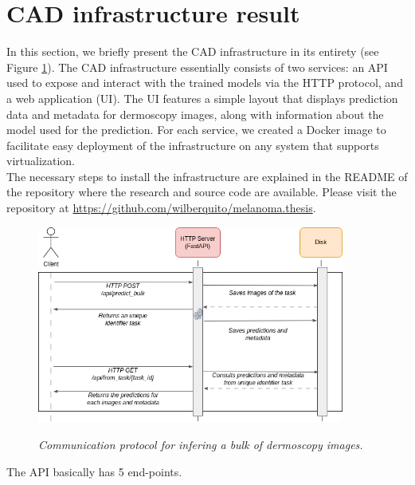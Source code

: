 \section{CAD infrastructure result}

In this section, we briefly present the CAD infrastructure in its entirety (see
Figure \ref{fig:background-task}). The CAD infrastructure essentially consists
of two services: an API used to expose and interact with the trained models via
the HTTP protocol, and a web application (UI). The UI features a simple layout
that displays prediction data and metadata for dermoscopy images, along with
information about the model used for the prediction. For each service, we
created a Docker image to facilitate easy deployment of the infrastructure on
any system that supports virtualization. \\

The necessary steps to install the infrastructure are explained in the README
of the repository where the research and source code are available. Please
visit the repository at
\href{https://github.com/wilberquito/melanoma.thesis}{https://github.com/wilberquito/melanoma.thesis}.


\begin{figure}[H]
  \centering
  \includegraphics[width=0.9\textwidth]{imatges/cad-result/BackgroundTask.drawio.png}
  \caption[]{\textit{Communication protocol for infering a bulk of dermoscopy images.}}
  {\label{fig:background-task}}
\end{figure}

The API basically has 5 end-points.

